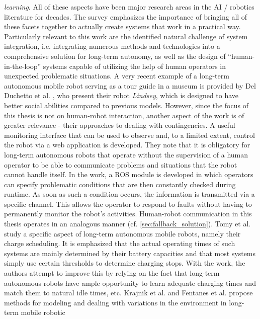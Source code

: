\documentclass[english, master, utf8]{base/thesis_KBS}
\begin{document}
\textit{learning}. All of these aspects have been major research areas in the AI / robotics literature for decades. The survey emphasizes the importance of bringing all of these
facets together to actually create systems that work in a practical way. Particularly relevant to this work are the identified natural challenge of system integration, i.e.
integrating numerous methods and technologies into a comprehensive solution for long-term autonomy, as well as the design of ``human-in-the-loop'' systems capable of utilizing the
help of human operators in unexpected problematic situations. \cite{Kunze:2018}\newline
A very recent example of a long-term autonomous mobile robot serving as a tour guide in a museum is provided by Del Duchetto et al. \cite{Duchetto:2019}, who present their robot
\textit{Lindsey}, which is designed to have better social abilities compared to previous models. However, since the focus of this thesis is not on human-robot interaction, another aspect of the work is of
greater relevance - their approaches to dealing with contingencies. A useful monitoring interface that can be used to observe and, to a limited extent, control the robot via a web
application is developed. They note that it is obligatory for long-term autonomous robots that operate without the supervision of a human operator to be able to communicate
problems and situations that the robot cannot handle itself. In the work, a ROS module is developed in which operators can specify problematic conditions that are then constantly
checked during runtime. As soon as such a condition occurs, the information is transmitted via a specific channel. This allows the operator to respond to faults without having to
permanently monitor the robot's activities. Human-robot communication in this thesis operates in an analogous manner (cf. \ref{sec:fallback_solution}).\newline
Tomy et al. \cite{Tomy:2019} study a specific aspect of long-term autonomous mobile robots, namely their charge scheduling. It is emphasized that the actual operating times of
such systems are mainly determined by their battery capacities and that most systems simply use certain thresholds to determine charging stops. With the work, the authors attempt
to improve this by relying on the fact that long-term autonomous robots have ample opportunity to learn adequate charging times and match them to natural idle times, etc.\newline
Krajnik et al. \cite{Krajnik:2019} and Fentanes et al. \cite{Fentanes:2015} propose methods for modeling and dealing with variations in the environment in long-term mobile robotic
\end{document}
